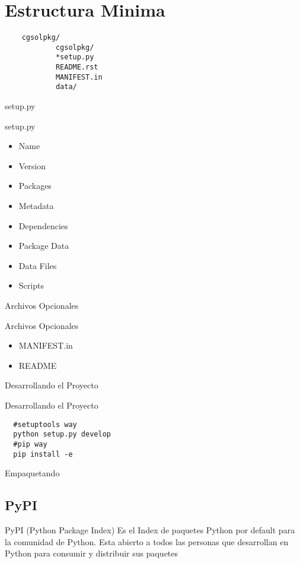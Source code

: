 \documentclass{beamer}
\begin{document}
\section{Estructura Minima}
\begin{verbatim}
    cgsolpkg/
            cgsolpkg/
            *setup.py 
            README.rst
            MANIFEST.in
            data/
\end{verbatim}
\begin{section}{setup.py}
  \begin{frame}{setup.py}
    \begin{itemize}
    \item Name
      \pause
    \item Version
      \pause
    \item Packages
      \pause
    \item Metadata
      \pause
    \item Dependencies
      \pause
    \item Package Data
      \pause
    \item Data Files
      \pause
    \item Scripts
    \end{itemize}
  \end{frame}
  \begin{section}{Archivos Opcionales}
    \begin{frame}{Archivos Opcionales}
      \begin{itemize}
      \item MANIFEST.in
        \pause
      \item README
      \end{itemize}
    \end{frame}
    \begin{section}{Desarrollando el Proyecto}
      \begin{frame}[fragile]{Desarrollando el Proyecto}
\begin{verbatim}
  #setuptools way
  python setup.py develop 
  #pip way
  pip install -e 
\end{verbatim}
      \end{frame}
      \begin{section}{Empaquetando}
        \subsection{PyPI}
        \begin{frame}{PyPI}
          \alert(Python Package Index) 
          Es el Index de paquetes Python por default para la comunidad de Python. 
          Esta abierto a todos las personas que desarrollan en Python para consumir y distribuir
          sus paquetes


\end{frame}
\end{section}
\end{section}
\end{section}
\end{section}
\end{document}
